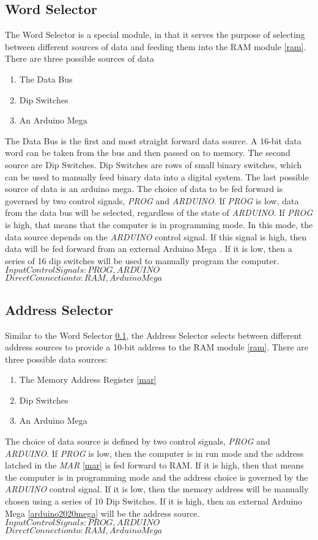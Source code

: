 \subsection{Word Selector} \label{word-select}
The Word Selector is a special module, in that it serves the purpose of selecting between different sources of data and feeding
them into the RAM module \ref{ram}. There are three possible sources of data
\begin{enumerate}
  \item The Data Bus
  \item Dip Switches
  \item An Arduino Mega
\end{enumerate}
The Data Bus is the first and most straight forward data source. A 16-bit data word can be taken from the bus and then passed on
to memory. The second source are Dip Switches. Dip Switches are rows of small binary switches, which can be used to manually feed
binary data into a digital system. The last possible source of data is an arduino mega. The choice of data to be fed forward is
governed by two control signals, \emph{PROG} and \emph{ARDUINO}. If \emph{PROG} is low, data from the data bus will be selected,
regardless of the state of \emph{ARDUINO}. If \emph{PROG} is high, that means that the computer is in programming mode. In this
mode, the data source depends on the \emph{ARDUINO} control signal. If this signal is high, then data will be fed forward from
an external Arduino Mega \cite{arduino2020mega}. If it is low, then a series of 16 dip switches will be used to manually program
the computer.  \\
\textbf{$Input Control Signals: PROG, ARDUINO$} \\
\textbf{$Direct Connection to: RAM, Arduino Mega$}

\subsection{Address Selector} \label{address-select}
Similar to the Word Selector \ref{word-select}, the Address Selector selects between different address sources to provide a 10-bit
address to  the RAM module \ref{ram}. There are three possible data sources:
\begin{enumerate}
  \item The Memory Address Register \ref{mar}
  \item Dip Switches
  \item An Arduino Mega
\end{enumerate}
The choice of data source is defined by two control signals, \emph{PROG} and \emph{ARDUINO}. If \emph{PROG} is low, then the
computer is in run mode and the address latched in the \emph{MAR} \ref{mar} is fed forward to RAM. If it is high, then that means
the computer is in programming mode and the address choice is governed by the \emph{ARDUINO} control signal. If it is low, then
the memory address will be manually chosen using a series of 10 Dip Switches. If it is high, then an external
Arduino Mega \ref{arduino2020mega} will be the address source. \\
\textbf{$Input Control Signals: PROG, ARDUINO$}
\textbf{$Direct Connection to: RAM, Arduino Mega$}

